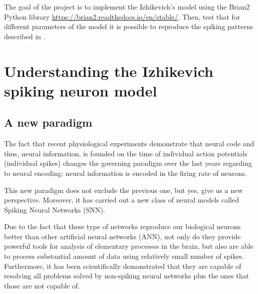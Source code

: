 \documentclass{article} %
\begin{document}
The goal of the project is to implement the Izhikevich’s model using the Brian2 Python library \url{https://brian2.readthedocs.io/en/stable/}. Then, test that for different parameters of the model it is possible to reproduce the spiking patterns described in \cite{Izhikevich2003Simple} \cite{Izhikevich2004Which}.

\section{Understanding the Izhikevich spiking neuron model}

\subsection{A new paradigm}
The fact that recent physiological experiments demonstrate that neural code and thus, neural information, is founded on the time of individual action potentials (individual spikes) changes the governing paradigm over the last years regarding to neural encoding: neural information is encoded in the firing rate of neurons.

This new paradigm does not exclude the previous one, but yes, give us a new perspective. Moreover, it has carried out a new class of neural models called Spiking Neural Networks (SNN).

Due to the fact that these type of networks reproduce our biological neurons better than other artificial neural networks (ANN), not only do they provide powerful tools for analysis of elementary processes in the brain, but also are able to process substantial amount of data using relatively small number of spikes. Furthermore, it has been scientifically demonstrated that they are capable of resolving all problems solved by non-spiking neural networks plus the ones that those are not capable of. 
\end{document}
